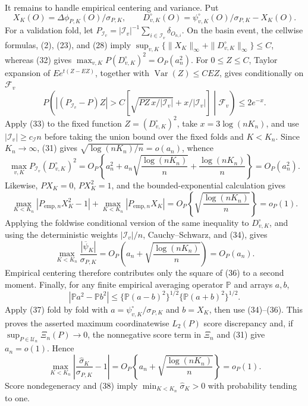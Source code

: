It remains to handle empirical centering and variance.  Put
\[
 X_K(O)=\Delta\phi_{P,K}(O)/\sigma_{P,K},\qquad
 D_{v,K}^{\circ}(O)=\psi_{v,K}^{\circ}(O)/\sigma_{P,K}-X_K(O).
\]
For a validation fold, let \(P_{\mathcal I_v}=|\mathcal I_v|^{-1}\sum_{i\in\mathcal I_v}\delta_{O_{n,i}}\).  On the basin event, the cellwise formulas, (2), (23), and (28) imply \(\sup_{v,K}\{\|X_K\|_\infty+\|D_{v,K}^{\circ}\|_\infty\}\leq C\), whereas (32) gives \(\max_{v,K}P(D_{v,K}^{\circ})^2=O_P(a_n^2)\).  For \(0\leq Z\leq C\), Taylor expansion of \(E e^{t(Z-EZ)}\), together with \(\operatorname{Var}(Z)\leq CEZ\), gives conditionally on \(\mathcal F_v\)
\[
 P\!\left(\left|(P_{\mathcal I_v}-P)Z\right|>
 C\left[\sqrt{PZ\,x/|\mathcal I_v|}+x/|\mathcal I_v|\right]
 \middle|\mathcal F_v\right)\leq2e^{-x}.                                  \tag{33}
\]
Apply (33) to the fixed function \(Z=(D_{v,K}^{\circ})^2\), take \(x=3\log(nK_n)\), and use \(|\mathcal I_v|\geq c_{\mathcal I}n\) before taking the union bound over the fixed folds and \(K<K_n\).  Since \(K_n\to\infty\), (31) gives \(\sqrt{\log(nK_n)/n}=o(a_n)\), whence
\[
 \max_{v,K}P_{\mathcal I_v}(D_{v,K}^{\circ})^2
 =O_P\!\left\{a_n^2+a_n\sqrt{\frac{\log(nK_n)}n}
 +\frac{\log(nK_n)}n\right\}=O_P(a_n^2).                                  \tag{34}
\]
Likewise, \(PX_K=0\), \(PX_K^2=1\), and the bounded-exponential calculation gives
\[
 \max_{K<K_n}|P_{\mathrm{emp},n}X_K^2-1|
 +\max_{K<K_n}|P_{\mathrm{emp},n}X_K|
 =O_P\!\left\{\sqrt{\frac{\log(nK_n)}n}\right\}=o_P(1).                \tag{35}
\]
Applying the foldwise conditional version of the same inequality to \(D_{v,K}^{\circ}\), and using the deterministic weights \(|\mathcal I_v|/n\), Cauchy--Schwarz, and (34), gives
\[
 \max_{K<K_n}\frac{|\overline\psi_K|}{\sigma_{P,K}}
 =O_P\!\left(a_n+\sqrt{\frac{\log(nK_n)}n}\right)=O_P(a_n).              \tag{36}
\]
Empirical centering therefore contributes only the square of (36) to a second moment.  Finally, for any finite empirical averaging operator \(\mathbb P\) and arrays \(a,b\),
\[
 |\mathbb P a^2-\mathbb P b^2|
 \leq\{\mathbb P(a-b)^2\}^{1/2}\{\mathbb P(a+b)^2\}^{1/2}.                \tag{37}
\]
Apply (37) fold by fold with \(a=\psi_{v,K}^{\circ}/\sigma_{P,K}\) and \(b=X_K\), then use (34)--(36).  This proves the asserted maximum coordinatewise \(L_2(P)\) score discrepancy and, if \(\sup_{P\in\mathcal U_n}\Xi_n(P)\to0\), the nonnegative score term in \(\Xi_n\) and (31) give \(a_n=o(1)\).  Hence
\[
 \max_{K<K_n}\left|\frac{\widehat\sigma_K}{\sigma_{P,K}}-1\right|
 =O_P\!\left\{a_n+\sqrt{\frac{\log(nK_n)}n}\right\}=o_P(1).                \tag{38}
\]
Score nondegeneracy and (38) imply \(\min_{K<K_n}\widehat\sigma_K>0\) with probability tending to one.

